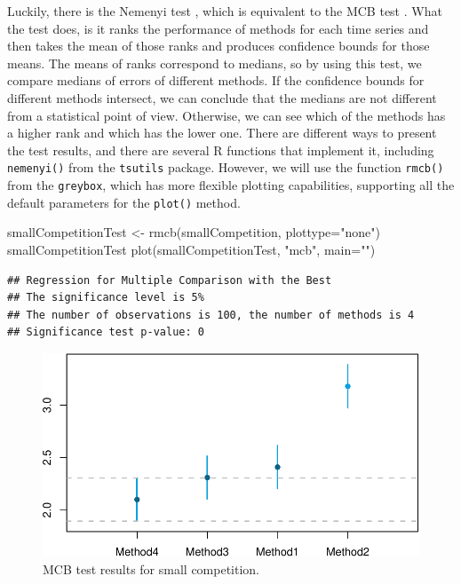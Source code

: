 \documentclass[
]{book}
\newenvironment{Shaded}{\begin{snugshade}}{\end{snugshade}}
\newcommand{\AttributeTok}[1]{\textcolor[rgb]{0.77,0.63,0.00}{#1}}
\newcommand{\FunctionTok}[1]{\textcolor[rgb]{0.00,0.00,0.00}{#1}}
\newcommand{\NormalTok}[1]{#1}
\newcommand{\OtherTok}[1]{\textcolor[rgb]{0.56,0.35,0.01}{#1}}
\newcommand{\StringTok}[1]{\textcolor[rgb]{0.31,0.60,0.02}{#1}}
\theoremstyle{definition}
\theoremstyle{definition}
\theoremstyle{definition}
\theoremstyle{definition}
\theoremstyle{remark}
\begin{document}
Luckily, there is the Nemenyi test \citep{Demsar2006}, which is equivalent to the MCB test \citep{Koning2005, KourentzesWeb2012}. What the test does, is it ranks the performance of methods for each time series and then takes the mean of those ranks and produces confidence bounds for those means. The means of ranks correspond to medians, so by using this test, we compare medians of errors of different methods. If the confidence bounds for different methods intersect, we can conclude that the medians are not different from a statistical point of view. Otherwise, we can see which of the methods has a higher rank and which has the lower one. There are different ways to present the test results, and there are several R functions that implement it, including \texttt{nemenyi()} from the \texttt{tsutils} package. However, we will use the function \texttt{rmcb()} from the \texttt{greybox}, which has more flexible plotting capabilities, supporting all the default parameters for the \texttt{plot()} method.

\begin{Shaded}
\begin{Highlighting}[]
\NormalTok{smallCompetitionTest }\OtherTok{\textless{}{-}} \FunctionTok{rmcb}\NormalTok{(smallCompetition, }\AttributeTok{plottype=}\StringTok{"none"}\NormalTok{)}
\NormalTok{smallCompetitionTest}
\FunctionTok{plot}\NormalTok{(smallCompetitionTest, }\StringTok{"mcb"}\NormalTok{, }\AttributeTok{main=}\StringTok{""}\NormalTok{)}
\end{Highlighting}
\end{Shaded}

\begin{verbatim}
## Regression for Multiple Comparison with the Best
## The significance level is 5%
## The number of observations is 100, the number of methods is 4
## Significance test p-value: 0
\end{verbatim}

\begin{figure}
\centering
\includegraphics{Svetunkov--2022----ADAM_files/figure-latex/mcbForCompetition-1.pdf}
\caption{\label{fig:mcbForCompetition}MCB test results for small competition.}
\end{figure}
\end{document}
